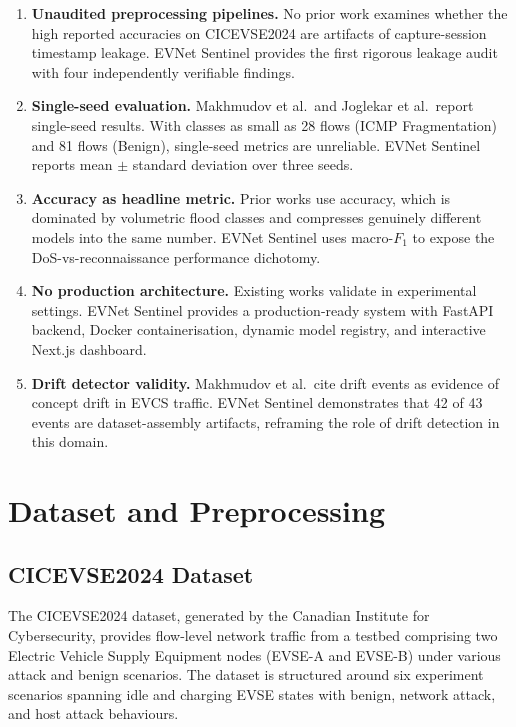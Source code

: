 \documentclass[conference]{IEEEtran}
\begin{document}
\begin{enumerate}
    \item \textbf{Unaudited preprocessing pipelines.} No prior work examines whether the high reported accuracies on CICEVSE2024 are artifacts of capture-session timestamp leakage. EVNet Sentinel provides the first rigorous leakage audit with four independently verifiable findings.
    \item \textbf{Single-seed evaluation.} Makhmudov et al.\ and Joglekar et al.\ report single-seed results. With classes as small as 28 flows (ICMP Fragmentation) and 81 flows (Benign), single-seed metrics are unreliable. EVNet Sentinel reports mean $\pm$ standard deviation over three seeds.
    \item \textbf{Accuracy as headline metric.} Prior works use accuracy, which is dominated by volumetric flood classes and compresses genuinely different models into the same number. EVNet Sentinel uses macro-$F_1$ to expose the DoS-vs-reconnaissance performance dichotomy.
    \item \textbf{No production architecture.} Existing works validate in experimental settings. EVNet Sentinel provides a production-ready system with FastAPI backend, Docker containerisation, dynamic model registry, and interactive Next.js dashboard.
    \item \textbf{Drift detector validity.} Makhmudov et al.\ cite drift events as evidence of concept drift in EVCS traffic. EVNet Sentinel demonstrates that 42 of 43 events are dataset-assembly artifacts, reframing the role of drift detection in this domain.
\end{enumerate}

\section{Dataset and Preprocessing}
\label{sec:dataset}

\subsection{CICEVSE2024 Dataset}

The CICEVSE2024 dataset, generated by the Canadian Institute for Cybersecurity, provides flow-level network traffic from a testbed comprising two Electric Vehicle Supply Equipment nodes (EVSE-A and EVSE-B) under various attack and benign scenarios. The dataset is structured around six experiment scenarios spanning idle and charging EVSE states with benign, network attack, and host attack behaviours.
\end{document}
